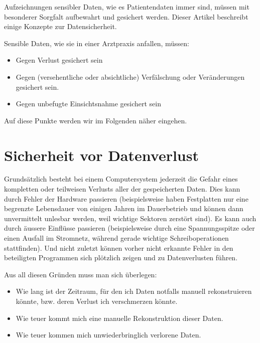 %

\label{sicherheit}
Aufzeichnungen sensibler Daten, wie es Patientendaten immer sind, müssen mit besonderer Sorgfalt
aufbewahrt und gesichert werden. Dieser Artikel beschreibt einige Konzepte zur Datensicherheit.

Sensible Daten, wie sie in einer Arztpraxis anfallen, müssen:
\begin{itemize}
  \item{Gegen Verlust gesichert sein}
  \item{Gegen (versehentliche oder absichtliche) Verfälschung oder
  Veränderungen gesichert sein.}
  \item {Gegen unbefugte Einsichtsnahme gesichert sein}
\end{itemize}

Auf diese Punkte werden wir im Folgenden näher eingehen.

\section{Sicherheit vor Datenverlust}
Grundsätzlich besteht bei einem Computersystem jederzeit die Gefahr eines kompletten
oder teilweisen Verlusts aller der gespeicherten Daten. Dies kann durch Fehler der Hardware
passieren (beispielsweise haben Festplatten nur eine begrenzte Lebensdauer von einigen Jahren
im Dauerbetrieb und können dann unvermittelt unlesbar werden, weil wichtige Sektoren zerstört
sind). Es kann auch durch äussere Einflüsse passieren (beispielsweise durch eine Spannungsspitze
oder einen Ausfall im Stromnetz, während gerade wichtige Schreiboperationen stattfinden).
Und nicht zuletzt können vorher nicht erkannte Fehler in den beteiligten Programmen
sich plötzlich zeigen und zu Datenverlusten führen.

Aus all diesen Gründen muss man sich überlegen:
\begin{itemize}
  \item {Wie lang ist der Zeitraum, für den ich Daten notfalls manuell
  rekonstruieren könnte, bzw. deren Verlust ich verschmerzen könnte.}
  \item {Wie teuer kommt mich eine manuelle Rekonstruktion dieser Daten.}
  \item {Wie teuer kommen mich unwiederbringlich verlorene Daten.}
\end{itemize}

